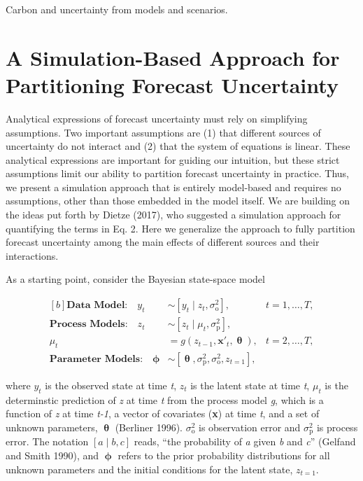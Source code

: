 \documentclass[12pt,]{article}
\begin{document}
Carbon and uncertainty from models and scenarios.

\hypertarget{a-simulation-based-approach-for-partitioning-forecast-uncertainty}{%
\section{A Simulation-Based Approach for Partitioning Forecast
Uncertainty}\label{a-simulation-based-approach-for-partitioning-forecast-uncertainty}}

Analytical expressions of forecast uncertainty must rely on simplifying
assumptions. Two important assumptions are (1) that different sources of
uncertainty do not interact and (2) that the system of equations is
linear. These analytical expressions are important for guiding our
intuition, but these strict assumptions limit our ability to partition
forecast uncertainty in practice. Thus, we present a simulation approach
that is entirely model-based and requires no assumptions, other than
those embedded in the model itself. We are building on the ideas put
forth by Dietze (2017), who suggested a simulation approach for
quantifying the terms in Eq. 2. Here we generalize the approach to fully
partition forecast uncertainty among the main effects of different
sources and their interactions.

As a starting point, consider the Bayesian state-space model

\begin{equation}
\begin{aligned}[b]
\textbf{Data Model:} \quad y_t &\sim \left[y_t \;|\; z_t, \sigma^2_{\text{o}}\right], &t = 1,\dots,T, \\ 
\textbf{Process Models:} \quad z_t &\sim \left[z_t \;|\; \mu_t, \sigma^2_{\text{p}}\right],  \\ 
\mu_t &= g \left(z_{t-1},\textbf{x}'_t, \bm{\uptheta} \right), &t = 2,\dots,T, \\ 
\textbf{Parameter Models:} \quad \bm{\upphi} &\sim \left[\bm{\uptheta},\sigma^2_{\text{p}},\sigma^2_{\text{o}},z_{t=1} \right],
\end{aligned}
\end{equation}

\noindent{}where \(y_t\) is the observed state at time \emph{t}, \(z_t\)
is the latent state at time \emph{t}, \(\mu_t\) is the determinstic
prediction of \emph{z} at time \emph{t} from the process model \emph{g},
which is a function of \emph{z} at time \emph{t-1}, a vector of
covariates (\textbf{x}) at time \emph{t}, and a set of unknown
parameters, \(\bm{\uptheta}\) (Berliner 1996). \(\sigma^2_{\text{o}}\)
is observation error and \(\sigma^2_{\text{p}}\) is process error. The
notation \(\left[a \;|\; b, c\right]\) reads, ``the probability of
\emph{a} given \emph{b} and \emph{c}'' (Gelfand and Smith 1990), and
\(\bm{\upphi}\) refers to the prior probability distributions for all
unknown parameters and the initial conditions for the latent state,
\(z_{t=1}\).
\end{document}
